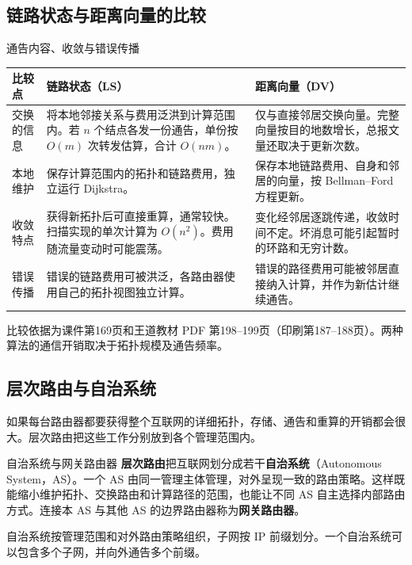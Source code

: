 \subsection{链路状态与距离向量的比较}
\begin{proposition}{通告内容、收敛与错误传播}
\small
\begin{tabularx}{\linewidth}{@{}>{\raggedright\arraybackslash}p{1.65cm} >{\raggedright\arraybackslash}X >{\raggedright\arraybackslash}X@{}}
\toprule
比较点 & 链路状态（LS） & 距离向量（DV）\\\midrule
交换的信息 & 将本地邻接关系与费用泛洪到计算范围内。若 $n$ 个结点各发一份通告，单份按 $O(m)$ 次转发估算，合计 $O(nm)$。 & 仅与直接邻居交换向量。完整向量按目的地数增长，总报文量还取决于更新次数。\\
本地维护 & 保存计算范围内的拓扑和链路费用，独立运行 Dijkstra。 & 保存本地链路费用、自身和邻居的向量，按 Bellman--Ford 方程更新。\\
收敛特点 & 获得新拓扑后可直接重算，通常较快。扫描实现的单次计算为 $O(n^2)$。费用随流量变动时可能震荡。 & 变化经邻居逐跳传递，收敛时间不定。坏消息可能引起暂时的环路和无穷计数。\\
错误传播 & 错误的链路费用可被洪泛，各路由器使用自己的拓扑视图独立计算。 & 错误的路径费用可能被邻居直接纳入计算，并作为新估计继续通告。\\
\bottomrule
\end{tabularx}
\par\smallskip 比较依据为课件第169页和王道教材 PDF 第198--199页（印刷第187--188页）。两种算法的通信开销取决于拓扑规模及通告频率。
\end{proposition}

\subsection{层次路由与自治系统}
如果每台路由器都要获得整个互联网的详细拓扑，存储、通告和重算的开销都会很大。层次路由把这些工作分别放到各个管理范围内。
\begin{definition}{自治系统与网关路由器}
\textbf{层次路由}把互联网划分成若干\textbf{自治系统}（Autonomous System，AS）。一个 AS 由同一管理主体管理，对外呈现一致的路由策略。这样既能缩小维护拓扑、交换路由和计算路径的范围，也能让不同 AS 自主选择内部路由方式。连接本 AS 与其他 AS 的边界路由器称为\textbf{网关路由器}。
\end{definition}
\begin{remark}
  自治系统按管理范围和对外路由策略组织，子网按 IP 前缀划分。一个自治系统可以包含多个子网，并向外通告多个前缀。
\end{remark}

